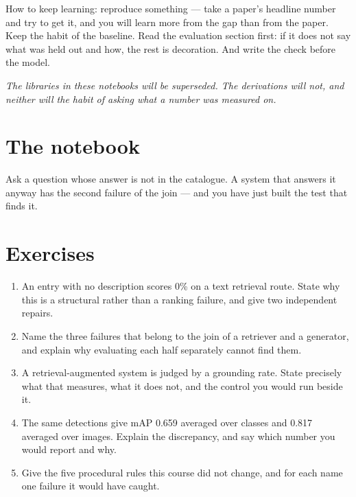 \documentclass[11pt,a4paper]{article}
\begin{document}
How to keep learning: reproduce something --- take a paper's headline number
and try to get it, and you will learn more from the gap than from the paper.
Keep the habit of the baseline. Read the evaluation section first: if it does
not say what was held out and how, the rest is decoration. And write the check
before the model.

\emph{The libraries in these notebooks will be superseded. The derivations will
not, and neither will the habit of asking what a number was measured on.}

\section{The notebook}

\begin{trybox}[title={What to change}]
Ask a question whose answer is not in the catalogue. A system that answers it
anyway has the second failure of the join --- and you have just built the test
that finds it.
\end{trybox}

\section{Exercises}

\begin{enumerate}[leftmargin=1.6em,itemsep=4pt]
  \item An entry with no description scores 0\% on a text retrieval route.
        State why this is a structural rather than a ranking failure, and give
        two independent repairs. \hfill \scope{[4]}
  \item Name the three failures that belong to the join of a retriever and a
        generator, and explain why evaluating each half separately cannot find
        them. \hfill \scope{[5]}
  \item A retrieval-augmented system is judged by a grounding rate. State
        precisely what that measures, what it does not, and the control you
        would run beside it. \hfill \scope{[5]}
  \item The same detections give mAP 0.659 averaged over classes and 0.817
        averaged over images. Explain the discrepancy, and say which number you
        would report and why. \hfill \scope{[4]}
  \item Give the five procedural rules this course did not change, and for each
        name one failure it would have caught. \hfill \scope{[5]}
\end{enumerate}
\end{document}
